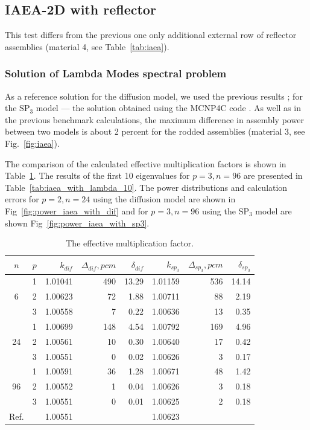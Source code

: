 \documentclass[authoryear]{elsarticle}
\begin{document}
\subsection{IAEA-2D with reflector}
This test differs from the previous one only additional external row of reflector assemblies (material 4, see Table~\ref{tab:iaea}). 

\subsubsection{Solution of Lambda Modes spectral problem}

As a reference solution for the diffusion model, we used the previous results \citep{avvakumov2015}; for the $\mathrm{SP_3}$ model --- the solution obtained using the MCNP4C code \citep{Bahabadi2016}. As well as in the previous benchmark calculations, the maximum difference in assembly power between two models is about 2 percent for the rodded assemblies (material 3, see Fig.~\ref{fig:iaea}).

The comparison of the calculated effective multiplication factors is shown in Table~\ref{tab:iaea_with_lambda}. 
The results of the first 10 eigenvalues for $ p = 3, n = 96 $ are presented in Table~\ref{tab:iaea_with_lambda_10}.
The power distributions and calculation errors for $p = 2, n = 24$ using the diffusion model are shown in Fig~\ref{fig:power_iaea_with_dif} and for $p = 3, n = 96$ using the $\mathrm{SP_3}$ model are shown Fig~\ref{fig:power_iaea_with_sp3}.

\begin{table}[h]
\caption{The effective multiplication factor.}
\label{tab:iaea_with_lambda}
\begin{center}
\begin{tabular}{c c r r r r r r}
\hline
$n$ & $p$ & $k_{dif}$ & $\Delta_{dif},pcm$ & $\delta_{dif}$ &$k_{sp_3}$& $\Delta_{sp_3},pcm$ & $\delta_{sp_3}$ \\
\hline
	& 1	& 1.01041& 490&13.29& 1.01159& 536& 14.14\\
6	& 2	& 1.00623&  72& 1.88& 1.00711&  88&  2.19\\
	& 3	& 1.00558&   7& 0.22& 1.00636&  13&  0.35\\ 
\hline
	& 1	& 1.00699& 148& 4.54& 1.00792& 169&  4.96\\
24& 2	& 1.00561&  10& 0.30& 1.00640&  17&  0.42\\
	& 3	& 1.00551&   0& 0.02& 1.00626&   3&  0.17\\ 
\hline
	& 1	& 1.00591&  36& 1.28& 1.00671&  48&  1.42\\
96& 2	& 1.00552&   1& 0.04& 1.00626&   3&  0.18\\
	& 3	& 1.00551&   0& 0.01& 1.00625&   2&  0.18\\ 
\hline
Ref.&   & 1.00551&    &     & 1.00623&     &\\ 
\hline
\end{tabular}
\end{center}
\end{table}
\end{document}
